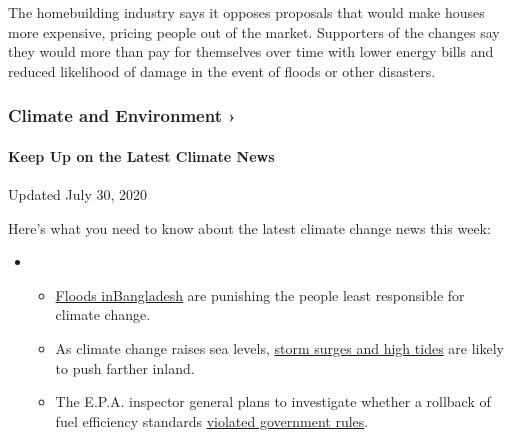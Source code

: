 The homebuilding industry says it opposes proposals that would make
houses more expensive, pricing people out of the market. Supporters of
the changes say they would more than pay for themselves over time with
lower energy bills and reduced likelihood of damage in the event of
floods or other disasters.

\href{https://www.nytimes.com/section/climate?action=click\&pgtype=Article\&state=default\&region=MAIN_CONTENT_1\&context=storylines_keepup}{}

\hypertarget{climate-and-environment-}{%
\subsubsection{Climate and Environment
›}\label{climate-and-environment-}}

\hypertarget{keep-up-on-the-latest-climate-news}{%
\paragraph{Keep Up on the Latest Climate
News}\label{keep-up-on-the-latest-climate-news}}

Updated July 30, 2020

Here's what you need to know about the latest climate change news this
week:

\begin{itemize}
\item
  \begin{itemize}
  \tightlist
  \item
    \href{https://www.nytimes.com/2020/07/30/climate/bangladesh-floods.html?action=click\&pgtype=Article\&state=default\&region=MAIN_CONTENT_1\&context=storylines_keepup}{Floods
    in}\href{https://www.nytimes.com/2020/07/30/climate/bangladesh-floods.html?action=click\&pgtype=Article\&state=default\&region=MAIN_CONTENT_1\&context=storylines_keepup}{Bangladesh}
    are punishing the people least responsible for climate change.
  \item
    As climate change raises sea levels,
    \href{https://www.nytimes.com/2020/07/30/climate/sea-level-inland-floods.html?action=click\&pgtype=Article\&state=default\&region=MAIN_CONTENT_1\&context=storylines_keepup}{storm
    surges and high tides} are likely to push farther inland.
  \item
    The E.P.A. inspector general plans to investigate whether a rollback
    of fuel efficiency standards
    \href{https://www.nytimes.com/2020/07/27/climate/trump-fuel-efficiency-rule.html?action=click\&pgtype=Article\&state=default\&region=MAIN_CONTENT_1\&context=storylines_keepup}{violated
    government rules}.
  \end{itemize}
\end{itemize}

